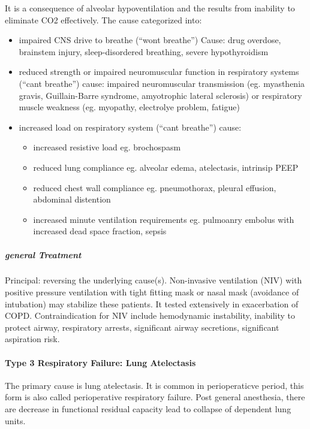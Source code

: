 \documentclass[
  letterpaper,
  DIV=11,
  numbers=noendperiod]{scrreprt}
\let\oldparagraph\paragraph
\renewcommand{\paragraph}[1]{\oldparagraph{#1}\mbox{}}
\let\oldsubparagraph\subparagraph
\renewcommand{\subparagraph}[1]{\oldsubparagraph{#1}\mbox{}}
\begin{document}
It is a consequence of alveolar hypoventilation and the results from
inability to eliminate CO2 effectively. The cause categorized into:

\begin{itemize}
\item
  impaired CNS drive to breathe (``wont breathe'') Cause: drug overdose,
  brainstem injury, sleep-disordered breathing, severe hypothyroidism
\item
  reduced strength or impaired neuromuscular function in respiratory
  systems (``cant breathe'') cause: impaired neuromuscular transmission
  (eg. myasthenia gravis, Guillain-Barre syndrome, amyotrophic lateral
  sclerosis) or respiratory muscle weakness (eg. myopathy, electrolye
  problem, fatigue)
\item
  increased load on respiratory system (``cant breathe'') cause:

  \begin{itemize}
  \item
    increased resistive load eg. brochospasm
  \item
    reduced lung compliance eg. alveolar edema, atelectasis, intrinsip
    PEEP
  \item
    reduced chest wall compliance eg. pneumothorax, pleural effusion,
    abdominal distention
  \item
    increased minute ventilation requirements eg. pulmoanry embolus with
    increased dead space fraction, sepsis
  \end{itemize}
\end{itemize}

\subparagraph{general Treatment}\label{general-treatment-1}

Principal: reversing the underlying cause(s). Non-invasive ventilation
(NIV) with positive pressure ventilation with tight fitting mask or
nasal mask (avoidance of intubation) may stabilize these patients. It
tested extensively in exacerbation of COPD. Contraindication for NIV
include hemodynamic instability, inability to protect airway,
respiratory arrests, significant airway secretions, significant
aspiration risk.

\paragraph{Type 3 Respiratory Failure: Lung
Atelectasis}\label{type-3-respiratory-failure-lung-atelectasis}

The primary cause is lung atelectasis. It is common in perioperaticve
period, this form is also called perioperative respiratory failure. Post
general anesthesia, there are decrease in functional residual capacity
lead to collapse of dependent lung units.
\end{document}

